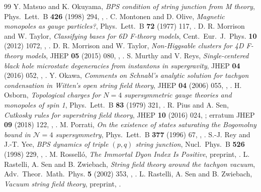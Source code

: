 \begin{thebibliography}{99}
 Y. Matsuo and K. Okuyama, \emph{BPS condition of string junction from M theory}, Phys.\ Lett.\ B \textbf{426} (1998) 294, , .
 C. Montonen and D. Olive, \emph{Magnetic monopoles as gauge particles?}, Phys.\ Lett.\ B \textbf{72} (1977) 117, .
 D. R. Morrison and W. Taylor, \emph{Classifying bases for 6D F-theory models}, Cent.\ Eur.\ J.\ Phys. \textbf{10} (2012) 1072, , .
 D. R. Morrison and W. Taylor, \emph{Non-Higgsable clusters for 4D F-theory models}, JHEP \textbf{05} (2015) 080, , .
 S. Murthy and V. Reys, \emph{Single-centered black hole microstate degeneracies from instantons in supergravity}, JHEP \textbf{04} (2016) 052, , .
 Y. Okawa, \emph{Comments on Schnabl's analytic solution for ta\-chy\-on con\-den\-sa\-tion in Witten's open string field theory}, JHEP \textbf{04} (2006) 055, , .
 H. Osborn, \emph{Topological charges for $N=4$ supersymmetric gauge theories and monopoles of spin 1}, Phys.\ Lett.\ B \textbf{83} (1979) 321, .
 R. Pius and A. Sen, \emph{Cutkosky rules for superstring field theory}, JHEP \textbf{10} (2016) 024, ; erratum JHEP \textbf{09} (2018) 122, , .
 M. Porrati, \emph{On the existence of states saturating the Bogomolny bound in $\mathcal N=4$ supersymmetry}, Phys.\ Lett.\ B \textbf{377} (1996) 67, , .
 S.-J. Rey and J.-T. Yee, \emph{BPS dynamics of triple $(p,q)$ string junction}, Nucl.\ Phys.\ B \textbf{526} (1998) 229, , .
 M. Rosselló, \emph{The Immortal Dyon Index Is Positive}, preprint, .
 L. Rastelli, A. Sen and B. Zwiebach, \emph{String field theory around the tachyon vacuum}, Adv.\ Theor.\ Math.\ Phys. \textbf{5} (2002) 353, , .
 L. Rastelli, A. Sen and B. Zwiebach, \emph{Vacuum string field theory}, preprint, .

\end{thebibliography}
